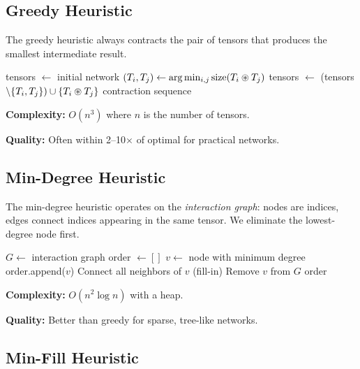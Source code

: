 \documentclass[11pt,a4paper]{article}
\begin{document}
\subsection{Greedy Heuristic}

The greedy heuristic always contracts the pair of tensors that produces the smallest intermediate result.

\begin{algorithm}[ht]
\caption{Greedy Contraction Order}
\label{alg:greedy_chirho}
\begin{algorithmic}[1]
\State tensors $\gets$ initial network
  \State $(T_i, T_j) \gets \arg\min_{i,j} \text{size}(T_i \circledast T_j)$
  \State tensors $\gets$ (tensors $\setminus \{T_i, T_j\}) \cup \{T_i \circledast T_j\}$
\EndWhile
\State \Return contraction sequence
\end{algorithmic}
\end{algorithm}

\textbf{Complexity:} $O(n^3)$ where $n$ is the number of tensors.

\textbf{Quality:} Often within 2--10$\times$ of optimal for practical networks.

\subsection{Min-Degree Heuristic}

The min-degree heuristic operates on the \emph{interaction graph}: nodes are indices,
edges connect indices appearing in the same tensor. We eliminate the lowest-degree node first.

\begin{algorithm}[ht]
\caption{Min-Degree Variable Elimination}
\label{alg:min_degree_chirho}
\begin{algorithmic}[1]
\State $G \gets$ interaction graph
\State order $\gets []$
  \State $v \gets$ node with minimum degree
  \State order.append($v$)
  \State Connect all neighbors of $v$ (fill-in)
  \State Remove $v$ from $G$
\EndWhile
\State \Return order
\end{algorithmic}
\end{algorithm}

\textbf{Complexity:} $O(n^2 \log n)$ with a heap.

\textbf{Quality:} Better than greedy for sparse, tree-like networks.

\subsection{Min-Fill Heuristic}
\end{document}

